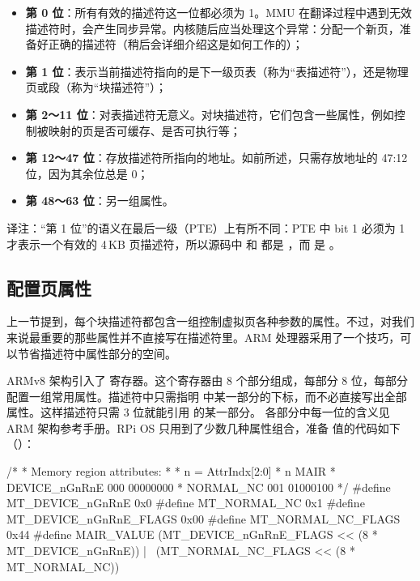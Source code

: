 \begin{itemize}
  \item \textbf{第 0 位}：所有有效的描述符这一位都必须为 1。MMU 在翻译过程中遇到无效描述符时，会产生同步异常。内核随后应当处理这个异常：分配一个新页，准备好正确的描述符（稍后会详细介绍这是如何工作的）；
  \item \textbf{第 1 位}：表示当前描述符指向的是下一级页表（称为“表描述符”），还是物理页或段（称为“块描述符”）；
  \item \textbf{第 2～11 位}：对表描述符无意义。对块描述符，它们包含一些属性，例如控制被映射的页是否可缓存、是否可执行等；
  \item \textbf{第 12～47 位}：存放描述符所指向的地址。如前所述，只需存放地址的 47:12 位，因为其余位总是 0；
  \item \textbf{第 48～63 位}：另一组属性。
\end{itemize}

\begin{remark}
  译注：“第 1 位”的语义在最后一级（PTE）上有所不同：PTE 中 bit 1 必须为 1 才表示一个有效的 4\,KB 页描述符，所以源码中  和  都是 ，而  是 。
\end{remark}

\subsection{配置页属性}

上一节提到，每个块描述符都包含一组控制虚拟页各种参数的属性。不过，对我们来说最重要的那些属性并不直接写在描述符里。ARM 处理器采用了一个技巧，可以节省描述符中属性部分的空间。

ARMv8 架构引入了  寄存器。这个寄存器由 8 个部分组成，每部分 8 位，每部分配置一组常用属性。描述符中只需指明  中某一部分的下标，而不必直接写出全部属性。这样描述符只需 3 位就能引用  的某一部分。 各部分中每一位的含义见 ARM 架构参考手册。RPi OS 只用到了少数几种属性组合，准备  值的代码如下（）：

\begin{ccode}
/*
 * Memory region attributes:
 *
 *   n = AttrIndx[2:0]
 *			n	MAIR
 *   DEVICE_nGnRnE	000	00000000
 *   NORMAL_NC		001	01000100
 */
#define MT_DEVICE_nGnRnE 		0x0
#define MT_NORMAL_NC			0x1
#define MT_DEVICE_nGnRnE_FLAGS		0x00
#define MT_NORMAL_NC_FLAGS  		0x44
#define MAIR_VALUE			(MT_DEVICE_nGnRnE_FLAGS << (8 * MT_DEVICE_nGnRnE)) | \
					(MT_NORMAL_NC_FLAGS << (8 * MT_NORMAL_NC))
\end{ccode}

